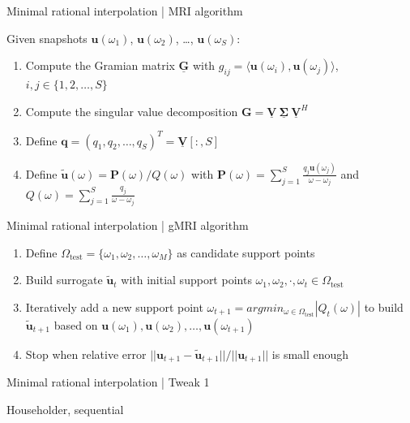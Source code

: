 \documentclass{beamer}
\begin{document}
\begin{frame}{Minimal rational interpolation | MRI algorithm}

    Given snapshots $\mathbf{u}(\omega_1)$, $\mathbf{u}(\omega_2)$, \dots, $\mathbf{u}(\omega_S)$:
    \begin{enumerate}
        \item<2-> Compute the Gramian matrix $\mathbf{\underline{G}}$ with $g_{ij} = \langle \mathbf{u}(\omega_i), \mathbf{u}(\omega_j) \rangle$, $i,j \in \{1, 2, \dots, S\}$
        \item<3-> Compute the singular value decomposition $\mathbf{\mathbf{G}} = \mathbf{\underline{V}}~\boldsymbol{\underline{\Sigma}}~\mathbf{\underline{V}}^H$
        \item<4-> Define $\mathbf{q} = (q_1, q_2, \dots, q_S)^T = \mathbf{\underline{V}}[:, S]$
        \item<5-> Define $\mathbf{\tilde{u}}(\omega) = \mathbf{P}(\omega) / Q(\omega)$ with $\mathbf{P}(\omega) = \sum_{j=1}^S \frac{q_j \mathbf{u}(\omega_j)}{\omega - \omega_j}$ and $Q(\omega) = \sum_{j=1}^S \frac{q_j}{\omega - \omega_j}$
    \end{enumerate}

\end{frame}

\begin{frame}{Minimal rational interpolation | gMRI algorithm}
    
    \begin{enumerate}
        \item<1-> Define $\Omega_{\text{test}} = \{\omega_1, \omega_2, \dots, \omega_M\}$ as candidate support points
        \item<2-> Build surrogate $\mathbf{\tilde{u}}_{t}$ with initial support points $\omega_1, \omega_2, \cdot, \omega_t \in \Omega_{\text{test}}$
        \item<3-> Iteratively add a new support point $\omega_{t+1} = argmin_{\omega \in \Omega_{\text{test}}} |Q_t(\omega)|$ to build $\mathbf{\tilde{u}}_{t+1}$ based on $\mathbf{u}(\omega_1), \mathbf{u}(\omega_2), \dots, \mathbf{u}(\omega_{t+1})$
        \item<4-> Stop when relative error $||\mathbf{u}_{t+1} - \mathbf{\tilde{u}}_{t+1}|| / ||\mathbf{u}_{t+1}||$ is small enough
    \end{enumerate}

\end{frame}

\begin{frame}{Minimal rational interpolation | Tweak 1}
    
    Householder, sequential

\end{frame}
\end{document}
